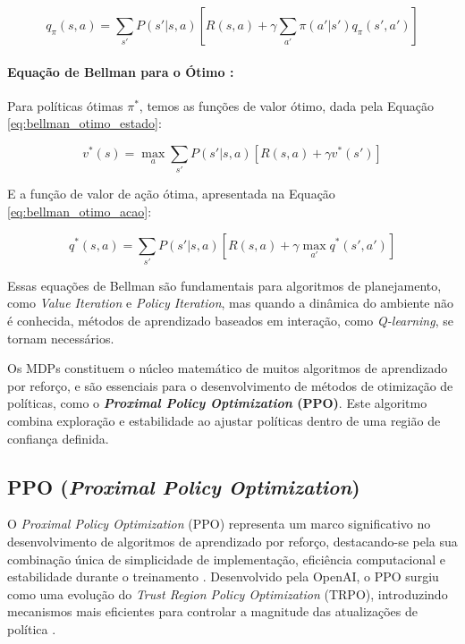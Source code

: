 \begin{equation}
\label{eq:bellman_acao}
q_\pi(s, a) = \sum_{s'} P(s'|s, a) \left[ R(s, a) + \gamma \sum_{a'} \pi(a'|s') q_\pi(s', a') \right]
\end{equation}

\paragraph{Equação de Bellman para o Ótimo \cite{sutton}:}
Para políticas ótimas \(\pi^*\), temos as funções de valor ótimo, dada pela Equação \ref{eq:bellman_otimo_estado}:

\begin{equation}
\label{eq:bellman_otimo_estado}
v^*(s) = \max_a \sum_{s'} P(s'|s, a) \left[ R(s, a) + \gamma v^*(s') \right]
\end{equation}

E a função de valor de ação ótima, apresentada na Equação \ref{eq:bellman_otimo_acao}:

\begin{equation}
\label{eq:bellman_otimo_acao}
q^*(s, a) = \sum_{s'} P(s'|s, a) \left[ R(s, a) + \gamma \max_{a'} q^*(s', a') \right]
\end{equation}

Essas equações de Bellman são fundamentais para algoritmos de planejamento, como \textit{Value Iteration} e \textit{Policy Iteration}, mas quando a dinâmica do ambiente não é conhecida, métodos de aprendizado baseados em interação, como \textit{Q-learning}, se tornam necessários.

Os MDPs constituem o núcleo matemático de muitos algoritmos de aprendizado por reforço, e são essenciais para o desenvolvimento de métodos de otimização de políticas, como o \textbf{\textit{Proximal Policy Optimization} (PPO)}. Este algoritmo combina exploração e estabilidade ao ajustar políticas dentro de uma região de confiança definida.

\subsection{PPO (\textit{Proximal Policy Optimization})}
\label{subsec:ppo}

O \textit{Proximal Policy Optimization} (PPO) representa um marco significativo no desenvolvimento de algoritmos de aprendizado por reforço, destacando-se pela sua combinação única de simplicidade de implementação, eficiência computacional e estabilidade durante o treinamento \cite{PPO}. Desenvolvido pela OpenAI, o PPO surgiu como uma evolução do \textit{Trust Region Policy Optimization} (TRPO), introduzindo mecanismos mais eficientes para controlar a magnitude das atualizações de política \cite{openia_ppo_doc}.


